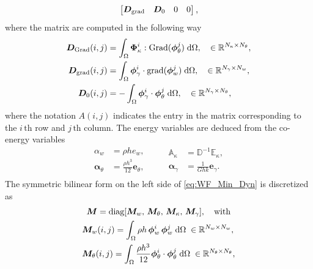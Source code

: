 \documentclass[preprint,12pt]{elsarticle}
\begin{document}
{\begin{equation}
\begin{bmatrix}
\bm{D}_{\mathrm{grad}} & \bm{D}_0 & 0 & 0       \vspace{.3mm}\\
\end{bmatrix},
\end{equation}
where the matrix are computed in the following way
\begin{equation}
\begin{aligned}
\bm{D}_{\mathrm{Grad}}(i,j) &= \int_{\Omega} \bm{\Phi}_{\kappa}^i : \mathrm{Grad} (\bm{\phi}_{\theta}^j) \d\Omega, \quad \in \mathbb{R}^{N_\kappa \times N_\theta},\\
\bm{D}_{\mathrm{grad}}(i,j) &= \int_{\Omega} \bm{\phi}_{\gamma}^i \cdot  \mathrm{grad}(\bm{\phi}^j_{w}) \d\Omega, \quad \in \mathbb{R}^{N_{\gamma} \times N_w},\\
\bm{D}_0(i,j)  &= -\int_{\Omega} \bm{\phi}_{\gamma}^i \cdot  \bm{\phi}^j_{\theta} \d\Omega, \quad \in \mathbb{R}^{N_{\gamma} \times N_\theta}, \\
\end{aligned}
\end{equation}
where the notation $A(i,j)$ indicates the entry in the matrix corresponding to the $i \, {\text{th}}$ row and $j \,{\text{th}}$ column. The energy variables are deduced from the co-energy variables 
\begin{equation}
\begin{aligned}
\alpha_w &= \rho h e_w, \\
\bm\alpha_{\theta} &=  \frac{\rho h^3}{12} \bm{e}_{\theta}, \\
\end{aligned} \qquad
\begin{aligned}
\mathbb{A}_{\kappa} &= \mathbb{D}^{-1} \mathbb{E}_{\kappa}, \\
\bm\alpha_{\gamma} &= \frac{1}{G h k} \bm{e}_{\gamma}. \\
\end{aligned}
\end{equation}
The symmetric bilinear form on the left side of \eqref{eq:WF_Min_Dyn} is discretized as 
\begin{equation}
	\begin{gathered}
	\bm{M} = \text{diag}[\bm{M}_w,\, \bm{M}_\theta,\, \bm{M}_\kappa,\, \bm{M}_{\gamma}], \quad \text{with} \\
	\begin{aligned}
	&\bm{M}_w(i,j) = \int_{\Omega} \rho h \, \bm{\phi}_w^i \, \bm{\phi}_w^j \d\Omega \; \in \mathbb{R}^{N_w \times N_w}, \\
	&\bm{M}_\theta(i,j) = \int_{\Omega} \frac{\rho h^3}{12} \bm{\phi}_\theta^i \cdot \bm{\phi}_\theta^j \d\Omega \; \in \mathbb{R}^{N_\theta \times N_\theta},\\

\end{aligned}
\end{gathered}
\end{equation}}
\end{document}
